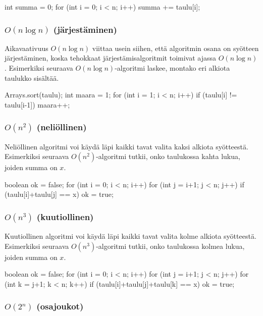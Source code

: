 \begin{code}
int summa = 0;
for (int i = 0; i < n; i++) {
    summa += taulu[i];
}
\end{code}

\subsubsection{$O(n \log n)$ (järjestäminen)}

Aikavaativuus $O(n \log n)$ viittaa usein siihen,
että algoritmin osana on syöt\-teen järjestäminen,
koska tehokkaat järjestämisalgoritmit
toimivat ajassa $O(n \log n)$.
Esimerkiksi seuraava $O(n \log n)$-algoritmi laskee,
montako eri alkiota taulukko sisältää.

\begin{code}
Arrays.sort(taulu);
int maara = 1;
for (int i = 1; i < n; i++) {
    if (taulu[i] != taulu[i-1]) maara++;
}
\end{code}

\subsubsection{$O(n^2)$ (neliöllinen)}

Neliöllinen algoritmi voi käydä läpi kaikki tavat valita
kaksi alkiota syötteestä.
Esimerkiksi seuraava $O(n^2)$-algoritmi tutkii, onko taulukossa
kahta lukua, joiden summa on $x$.

\begin{code}
boolean ok = false;
for (int i = 0; i < n; i++) {
    for (int j = i+1; j < n; j++) {
        if (taulu[i]+taulu[j] == x) ok = true;
    }
}
\end{code}

\subsubsection{$O(n^3)$ (kuutiollinen)}

Kuutiollinen algoritmi voi käydä läpi kaikki tavat valita
kolme alkiota syöt\-teestä.
Esimerkiksi seuraava $O(n^3)$-algoritmi tutkii, onko taulukossa
kolmea lukua, joiden summa on $x$.

\begin{code}
boolean ok = false;
for (int i = 0; i < n; i++) {
    for (int j = i+1; j < n; j++) {
        for (int k = j+1; k < n; k++) {
            if (taulu[i]+taulu[j]+taulu[k] == x) ok = true;
        }
    }
}
\end{code}

\subsubsection{$O(2^n)$ (osajoukot)}

